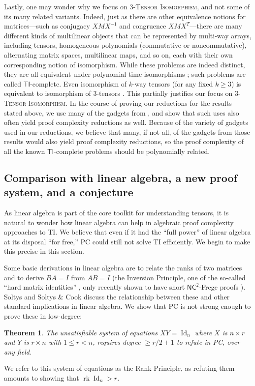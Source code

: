 \documentclass[10pt,a4paper]{article}
\newtheorem{theorem}{Theorem}[section]
\theoremstyle{definition}
\DeclareMathOperator{\Id}{Id}
\DeclareMathOperator{\rk}{rk}
\begin{document}
Lastly, one may wonder why we focus on 3-\textsc{Tensor Isomorphism}, and not some of its many related variants. Indeed, just as there are other equivalence notions for matrices---such as conjugacy $XMX^{-1}$ and congruence $XMX^T$---there are many different kinds of multilinear objects that can be represented by multi-way arrays, including tensors, homogeneous polynomials (commutative or noncommutative), alternating matrix spaces, multilinear maps, and so on, each with their own corresponding notion of isomorphism. While these problems are indeed distinct, they are all equivalent under polynomial-time isomorphisms \cite{FGS, GQ}; such problems are called $\mathsf{TI}$-complete. Even isomorphism of $k$-way tensors (for any fixed $k \geq 3$) is equivalent to isomorphism of 3-tensors \cite{GQ}. This partially justifies our focus on \textsc{3-Tensor Isomorphism}. In the course of proving our reductions for the results stated above, we use many of the gadgets from \cite{FGS, GQ}, and show that such uses also often yield proof complexity reductions as well. Because of the variety of gadgets used in our reductions, we believe that many, if not all, of the gadgets from those results would also yield proof complexity reductions, so the proof complexity of all the known $\mathsf{TI}$-complete problems should be polynomially related.

\subsection{Comparison with linear algebra, a new proof system, and a conjecture} \label{sec:conj}
As linear algebra is part of the core toolkit for understanding tensors, it is natural to wonder how linear algebra can help in algebraic proof complexity approaches to \textsc{TI}. We believe that even if it had the ``full power'' of linear algebra at its disposal ``for free,'' PC could still not solve \textsc{TI} efficiently. We begin to make this precise in this section.

Some basic derivations in linear algebra are to relate the ranks of two matrices and to derive $BA=I$ from $AB=I$ (the Inversion Principle, one of the so-called ``hard matrix identities'' \cite{SC}, only recently shown to have short $\mathsf{NC}^2$-Frege proofs \cite{HT}). Soltys \cite{soltys} and Soltys \& Cook \cite{SC} discuss the relationship between these and other standard implications in linear algebra. We show that PC is not strong enough to prove these in low-degree:


\begin{theorem}
The unsatisfiable system of equations $XY=\Id_n$ where $X$ is $n \times r$ and $Y$ is $r \times n$ with $1 \leq r < n$, requires degree $\geq r/2+1$ to refute in PC, over any field.
\end{theorem}
We refer to this system of equations as the Rank Principle, as refuting them amounts to showing that $\rk \Id_n > r$. 
\end{document}
